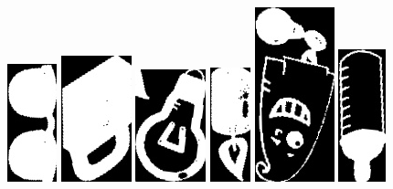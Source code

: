 \documentclass[10pt,a4paper]{article}
\begin{document}
\begin{center}
\includegraphics[scale=0.25]{2.3/sign02.jpg}
\includegraphics[scale=0.25]{2.3/sign03.jpg}
\includegraphics[scale=0.25]{2.3/sign04.jpg}
\includegraphics[scale=0.25]{2.3/sign05.jpg}
\includegraphics[scale=0.25]{2.3/sign06.jpg}
\includegraphics[scale=0.25]{2.3/sign07.jpg}

\end{center}
\end{document}
